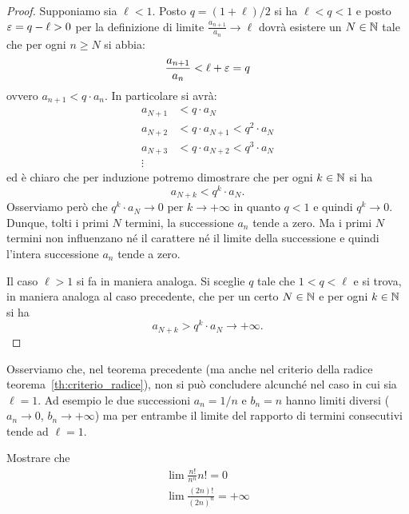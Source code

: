 \begin{proof}
Supponiamo sia $\ell<1$. Posto $q=(1+\ell)/2$ si ha $\ell < q < 1$ e posto $\varepsilon=q-\ell>0$ per la definizione di limite $\frac{a_{n+1}}{a_n}\to \ell$ dovrà esistere un $N\in \mathbb N$ tale
che per ogni $n\ge N$ si abbia:
\[
  \frac{a_{n+1}}{a_n} < \ell + \varepsilon = q
\]
ovvero $a_{n+1} < q \cdot a_n$. In particolare si avrà:
\begin{align*}
  a_{N+1} &< q \cdot a_N \\
  a_{N+2} &< q \cdot a_{N+1} < q^2\cdot a_N \\
  a_{N+3} &< q \cdot a_{N+2} < q^3\cdot a_N \\
  \vdots
\end{align*}
ed è chiaro che per induzione potremo dimostrare che per
ogni $k\in \mathbb N$ si ha
\[
  a_{N+k} < q^k\cdot a_N.
\]
Osserviamo però che $q^k \cdot a_N \to 0$ per $k\to +\infty$
in quanto $q<1$ e quindi $q^k \to 0$. Dunque, tolti i primi $N$ termini, la successione $a_n$ tende a zero. Ma i primi $N$ termini non influenzano né il carattere né il limite della successione e quindi l'intera successione $a_n$ tende a zero.

Il caso $\ell>1$ si fa in maniera analoga. Si sceglie $q$ tale
che $1<q<\ell$ e si trova, in maniera analoga al caso precedente,
che per un certo $N\in \mathbb N$ e per ogni $k\in \mathbb N$ si ha
\[
  a_{N+k} > q^k \cdot a_N \to +\infty.
\]
\end{proof}

Osserviamo che, nel teorema precedente (ma anche nel criterio della radice teorema~\ref{th:criterio_radice}),
non si può concludere alcunché nel
caso in cui sia $\ell = 1$.
Ad esempio le due successioni $a_n = 1/n$ e $b_n = n$
hanno limiti diversi ($a_n \to 0$, $b_n\to +\infty$) ma per entrambe
il limite del rapporto di termini consecutivi tende ad $\ell=1$.

\begin{exercise}
Mostrare che
\begin{gather*}
  \lim \frac{n!}{n^n}{n!} = 0 \\
  \lim \frac{(2n)!}{(2n)^n} = +\infty
\end{gather*}
\end{exercise}

